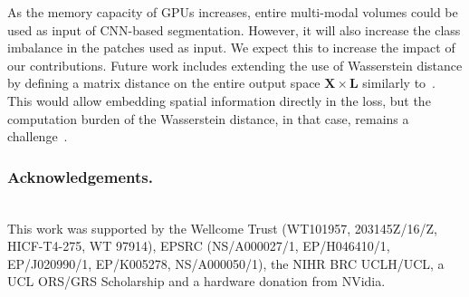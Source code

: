 \documentclass[runningheads,orivec,a4paper]{llncs}
\begin{document}
As the memory capacity of GPUs increases, entire multi-modal volumes
could be used as input of CNN-based segmentation. However, it will also increase the class imbalance in the patches used as input.
We expect this to increase the impact of our contributions. 
%
Future work includes extending the use of Wasserstein distance by
defining a matrix distance on the entire output space
$\mathbf{X}\times\mathbf{L}$ similarly to~\cite{manifold_ot}. This would
allow embedding spatial information directly in the loss, but the
computation burden of the Wasserstein distance, in that case, remains a
challenge~\cite{fast_emd}. 

\subsubsection*{Acknowledgements.}\hspace*{\fill} \\
This work was supported by the Wellcome Trust (WT101957, 203145Z/16/Z, HICF-T4-275, WT 97914), EPSRC (NS/A000027/1, EP/H046410/1, EP/J020990/1, EP/K005278, NS/A000050/1), the NIHR BRC UCLH/UCL, a UCL ORS/GRS Scholarship and a hardware donation from NVidia.


%

%

\end{document}
